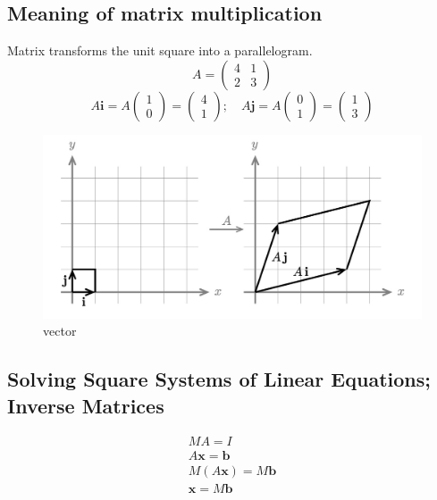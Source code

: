 \documentclass{article}
\begin{document}
\subsection{Meaning of matrix multiplication}
Matrix transforms the unit square into a parallelogram.
$$A =
  \begin{pmatrix}
    4 & 1 \\
    2 & 3
  \end{pmatrix}
$$
$$A\textbf{i} = A
  \begin{pmatrix}
    1 \\
    0
  \end{pmatrix} =
  \begin{pmatrix}
    4 \\
    1
  \end{pmatrix};\quad
  A\textbf{j} = A
  \begin{pmatrix}
    0 \\
    1
  \end{pmatrix} =
  \begin{pmatrix}
    1 \\
    3
  \end{pmatrix}
$$

\begin{figure}[h]
  \centering
  \includegraphics[width=.8\textwidth]{matrix_multiplication.png}
  \caption{vector}
  \label{vector}
\end{figure}

\subsection{Solving Square Systems of Linear Equations; Inverse Matrices}
\begin{gather*}
  MA = I \\
  A\textbf{x} = \textbf{b} \\
  M(A\textbf{x}) = M\textbf{b} \\
  \textbf{x} = M\textbf{b}
\end{gather*}
\end{document}
